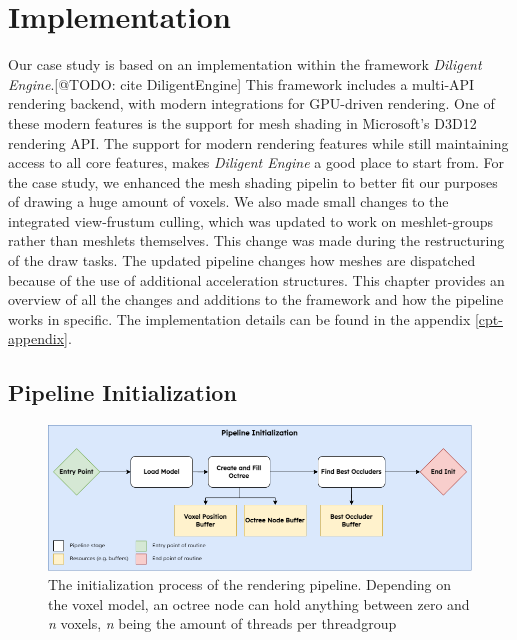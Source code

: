 \chapter{Implementation} \label{cpt-implementation}

Our case study is based on an implementation within the framework \emph{Diligent Engine}.[@TODO: cite DiligentEngine]
This framework includes a multi-\ac{API} rendering backend, with modern integrations for \ac{GPU}-driven rendering.
One of these modern features is the support for mesh shading in Microsoft's D3D12 rendering \ac{API}. 
The support for modern rendering features while still maintaining access to all core features, makes 
\emph{Diligent Engine} a good place to start from. For the case study, we enhanced the mesh shading pipelin 
to better fit our purposes of drawing a huge amount of voxels. We also made small changes to the integrated 
view-frustum culling, which was updated to work on meshlet-groups rather than meshlets themselves. This change 
was made during the restructuring of the draw tasks. The updated pipeline changes how meshes are dispatched 
because of the use of additional acceleration structures. This chapter provides an overview of all the changes and 
additions to the framework and how the pipeline works in specific. The implementation details can be found in the 
appendix \ref{cpt-appendix}.

\section{Pipeline Initialization} \label{sec-piepline-initialization}

\begin{figure}[h]
    \centering
    \includegraphics[width=\linewidth]{images/graphics/pipeline-initialization.png}
    \caption{The initialization process of the rendering pipeline. Depending on the voxel model, an octree node 
    can hold anything between zero and \emph{n} voxels, \emph{n} being the amount of threads per threadgroup}
    \label{fig:pipeline-initialization}
\end{figure}


